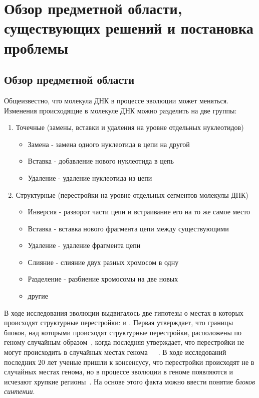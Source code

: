 \chapter{Обзор предметной области, существующих решений и постановка проблемы}

\section{Обзор предметной области}
Общеизвестно, что молекула ДНК в процессе эволюции может меняться.
Изменения происходящие в молекуле ДНК можно разделить на две группы:
\begin{enumerate}
  \item Точечные (замены, вставки и удаления на уровне отдельных нуклеотидов)
    \begin{itemize}
      \item Замена - замена одного нуклеотида в цепи на другой
      \item Вставка - добавление нового нуклеотида в цепь
      \item Удаление - удаление нуклеотида из цепи
    \end{itemize}
  \item Структурные (перестройки на уровне отдельных сегментов молекулы ДНК)
    \begin{itemize}
      \item Инверсия - разворот части цепи и встраивание его на то же самое место
      \item Вставка - вставка нового фрагмента цепи между существующими
      \item Удаление - удаление фрагмента цепи
      \item Слияние - слияние двух разных хромосом в одну
      \item Разделение - разбиение хромосомы на две новых
      \item другие
    \end{itemize}
\end{enumerate}

В ходе исследования эволюции выдвигалось две гипотезы о местах в которых происходят структурные перестройки:  и .
Первая утверждает, что границы блоков, над которыми происходят структурные перестройки, расположены по геному случайным образом~\cite{ohno1973ancient},
когда последняя утверждает,
что перестройки не могут происходить в случайных местах генома~\cite{pevzner2003human}~\cite{webber2005hotspots}~\cite{peng2006fragile}.
В ходе исследований последних 20 лет ученые пришли к консенсусу, что перестройки происходят не в случайных местах генома,
но в процессе эволюции в геноме появляются и исчезают хрупкие регионы~\cite{alekseyev2010comparative}.
На основе этого факта можно ввести понятие \textit{блоков синтении}.

